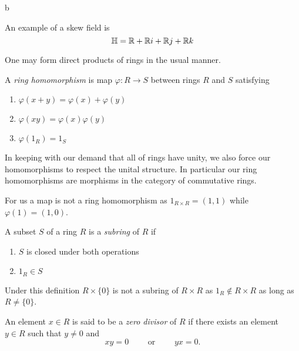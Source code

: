 b\documentclass[master.tex]{subfiles}
\begin{document}
\begin{example*}
  An example of a skew field is
  \[{\mathbb H} = {\mathbb R} + {\mathbb R} i + {\mathbb R} j + {\mathbb R} k\]
\end{example*}

One may form direct products of rings in the usual manner.

\begin{defn*}
  A \emph{ring homomorphism} is map \(\varphi \colon R \to S\) between rings \(R\) and \(S\) satisfying
  \begin{enumerate}[label=(\arabic*)]
  \item \(\varphi(x+y)=\varphi(x)+\varphi(y)\)
  \item \(\varphi(xy)=\varphi(x)\varphi(y)\)
  \item \(\varphi(1_R)=1_S\)
  \end{enumerate}
\end{defn*}

In keeping with our demand that all of rings have unity, we also force our homomorphisms to respect the unital
structure. In particular our ring homomorphisms are morphisms in the category of commutative rings.

\begin{example*}
  For us a map  is not a ring homomorphism as
  \(1_{R \times R} = (1,1)\) while \(\varphi(1)=(1,0)\).
\end{example*}

\begin{defn*}
  A subset \(S\) of a ring \(R\) is a \emph{subring} of \(R\) if
  \begin{enumerate}[label=(\arabic*)]
  \item \(S\) is closed under both operations
  \item \(1_R \in S\)
  \end{enumerate}
\end{defn*}

\begin{example*}
  Under this definition \(R \times \{0\}\) is not a subring of \(R \times R\) as \(1_R \not \in R \times R\) as long as
  \(R\neq\{0\}\).
\end{example*}

\begin{defn*}
  An element \(x \in R\) is said to be a \emph{zero divisor} of \(R\) if there exists an element \(y \in R\) such that
  \(y \neq 0\) and
  \[xy = 0 \qquad \text{ or } \qquad yx = 0.\]
\end{defn*}
\end{document}
